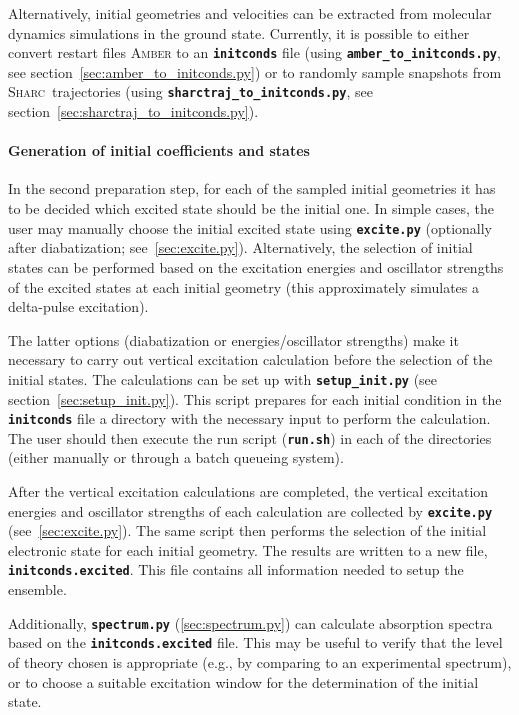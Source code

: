 \documentclass[a4paper,10pt,DIV=15,openany]{scrbook}
\newcommand{\sharc}{\textsc{Sharc}}
\newcommand{\ttt}[1]{\textbf{\texttt{#1}}}
\begin{document}
Alternatively, initial geometries and velocities can be extracted from molecular dynamics simulations in the ground state.
Currently, it is possible to either convert restart files \textsc{Amber} to an \ttt{initconds} file (using \ttt{amber\_to\_initconds.py}, see section~\ref{sec:amber_to_initconds.py}) or to randomly sample snapshots from \sharc\ trajectories (using \ttt{sharctraj\_to\_initconds.py}, see section~\ref{sec:sharctraj_to_initconds.py}).

\paragraph{Generation of initial coefficients and states}

In the second preparation step, for each of the sampled initial geometries it has to be decided which excited state should be the initial one. In simple cases, the user may manually choose the initial excited state using \ttt{excite.py} (optionally after diabatization; see~\ref{sec:excite.py}). Alternatively, the selection of initial states can be performed based on the excitation energies and oscillator strengths of the excited states at each initial geometry (this approximately simulates a delta-pulse excitation). 

The latter options (diabatization or energies/oscillator strengths) make it necessary to carry out vertical excitation calculation before the selection of the initial states.
The calculations can be set up with \ttt{setup\_init.py} (see section~\ref{sec:setup_init.py}). This script prepares for each initial condition in the \ttt{initconds} file a directory with the necessary input to perform the calculation. The user should then execute the run script (\ttt{run.sh}) in each of the directories (either manually or through a batch queueing system).

After the vertical excitation calculations are completed, the vertical excitation energies and oscillator strengths of each calculation are collected by \ttt{excite.py} (see~\ref{sec:excite.py}). The same script then performs the selection of the initial electronic state for each initial geometry. The results are written to a new file, \ttt{initconds.excited}. This file contains all information needed to setup the ensemble. 

Additionally, \ttt{spectrum.py} (\ref{sec:spectrum.py}) can calculate absorption spectra based on the \ttt{initconds.excited} file. This may be useful to verify that the level of theory chosen is appropriate (e.g., by comparing to an experimental spectrum), or to choose a suitable excitation window for the determination of the initial state.
\end{document}
